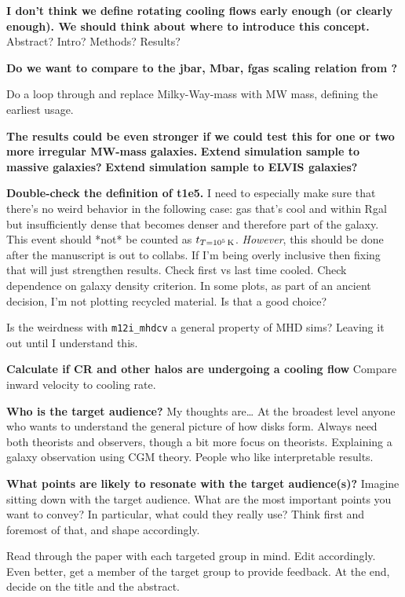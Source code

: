 \documentclass[fleqn,usenatbib]{mnras}
\newcommand{\tcon}{t_{T=10^5\,{\rm K}}}
\begin{document}
\textbf{
I don't think we define rotating cooling flows early enough (or clearly enough).
We should think about where to introduce this concept.
}
Abstract?
Intro?
Methods?
Results?

\textbf{Do we want to compare to the jbar, Mbar, fgas scaling relation from \cite{Pina2021}?}

Do a loop through and replace Milky-Way-mass with MW mass, defining the earliest usage.

\textbf{The results could be even stronger if we could test this for one or two more irregular MW-mass galaxies.}
\textbf{Extend simulation sample to massive galaxies?}
\textbf{Extend simulation sample to ELVIS galaxies?}

\textbf{Double-check the definition of t1e5.}
I need to especially make sure that there's no weird behavior in the following case:
gas that's cool and within Rgal but insufficiently dense that becomes denser and therefore part of the galaxy.
This event should *not* be counted as $\tcon$.
\textit{However}, this should be done after the manuscript is out to collabs.
If I'm being overly inclusive then fixing that will just strengthen results.
Check first vs last time cooled.
Check dependence on galaxy density criterion.
In some plots, as part of an ancient decision, I'm not plotting recycled material.
Is that a good choice?

Is the weirdness with \texttt{m12i\_mhdcv} a general property of MHD sims?
Leaving it out until I understand this.

\textbf{Calculate if CR and other halos are undergoing a cooling flow}
Compare inward velocity to cooling rate.

\textbf{
Who is the target audience?
}
My thoughts are\ldots
At the broadest level anyone who wants to understand the general picture of how disks form.
Always need both theorists and observers, though a bit more focus on theorists.
Explaining a galaxy observation using CGM theory.
People who like interpretable results.

\textbf{What points are likely to resonate with the target audience(s)?}
Imagine sitting down with the target audience.
What are the most important points you want to convey?
In particular, what could they really use?
Think first and foremost of that, and shape accordingly.

Read through the paper with each targeted group in mind.
Edit accordingly.
Even better, get a member of the target group to provide feedback.
At the end, decide on the title and the abstract.
\end{document}
